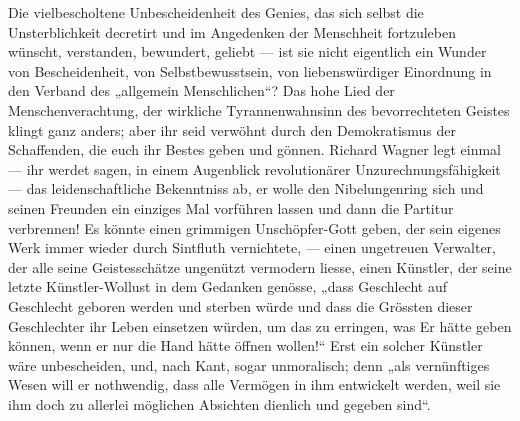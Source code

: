 Die vielbescholtene Unbescheidenheit des Genies, das sich selbst die Unsterblichkeit decretirt und im Angedenken der Menschheit fortzuleben wünscht, verstanden, bewundert, geliebt — ist sie nicht eigentlich ein Wunder von Bescheidenheit, von  Selbstbewusstsein, von liebenswürdiger Einordnung in den Verband des „allgemein Menschlichen“? Das hohe Lied der Menschenverachtung, der wirkliche Tyrannenwahnsinn des bevorrechteten Geistes klingt ganz anders; aber ihr seid verwöhnt durch den Demokratismus der Schaffenden, die euch ihr Bestes geben und gönnen. Richard Wagner legt einmal — ihr werdet sagen, in einem Augenblick revolutionärer Unzurechnungsfähigkeit — das leidenschaftliche Bekenntniss ab, er wolle den Nibelungenring sich und seinen Freunden ein einziges Mal vorführen lassen und dann die Partitur verbrennen! Es könnte einen grimmigen Unschöpfer-Gott geben, der sein eigenes Werk immer wieder durch Sintfluth vernichtete, — einen ungetreuen Verwalter, der alle seine Geistesschätze ungenützt vermodern liesse, einen Künstler, der seine letzte Künstler-Wollust in dem Gedanken genösse, „dass Geschlecht auf Geschlecht geboren werden und sterben würde und dass die Grössten dieser Geschlechter ihr Leben einsetzen würden, um das zu erringen, was Er hätte geben können, wenn er nur die Hand hätte öffnen wollen!“ Erst ein solcher Künstler wäre unbescheiden, und, nach Kant, sogar unmoralisch; denn „als vernünftiges Wesen will er nothwendig, dass alle Vermögen in ihm entwickelt werden, weil sie ihm doch zu allerlei möglichen Absichten dienlich und gegeben sind“.
\par

